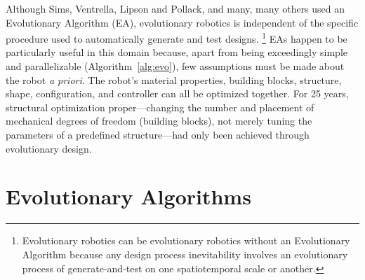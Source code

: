 Although Sims, Ventrella, Lipson and Pollack, and many, many others \cite{ventrella1998designing,lichtensteiger1999evolving,ray2001aesthetically,bongard2003evolving,hornby2002creating,komosinski2001comparison,komosinski2003framsticks,hotz2004asymmetric,vaughan2004evolution,shim2006evolving,bongard2006resilient,chaumont2007evolving,bongard2010utility,auerbach2010evolving,auerbach2010dynamic,lehman2011evolving,hiller2012automatic,cheney2013unshackling,cheney2014electro,lessin2013open,auerbach2014environmental,cheney2015tight,brodbeck2015morphological,lessin2015soft,cellucci20171d,cheney2018scalable,rosser2019sim2real} used an Evolutionary Algorithm (EA),
evolutionary robotics is independent of the specific procedure used to automatically generate and test designs.%
\footnote{%
Evolutionary robotics can be evolutionary robotics without an Evolutionary Algorithm because
any design process inevitability involves an evolutionary process of generate-and-test \cite{dennett1975law} on one spatiotemporal scale or another.
}
EAs happen to be particularly useful in this domain because, apart from being exceedingly simple and parallelizable (Algorithm~\ref{alg:evo}),
few assumptions must be made about the robot \textit{a priori}.
The robot's material properties, building blocks, structure, shape, configuration, and controller can all be optimized together.
For 25 years, structural optimization proper---changing the number and placement of mechanical degrees of freedom (building blocks), not merely tuning the parameters of a predefined structure---had only been achieved through evolutionary design.



\section{Evolutionary Algorithms}

